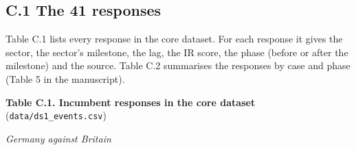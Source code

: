 \hypertarget{c.1-the-41-responses}{%
\subsection*{C.1 The 41 responses}\label{c.1-the-41-responses}}

Table C.1 lists every response in the core dataset. For each response it
gives the sector, the sector's milestone, the lag, the IR score, the
phase (before or after the milestone) and the source. Table C.2
summarises the responses by case and phase (Table 5 in the manuscript).

\textbf{Table C.1. Incumbent responses in the core dataset}
(\texttt{data/\allowbreak{}ds1\_\allowbreak{}events.csv})

\emph{Germany against Britain}


